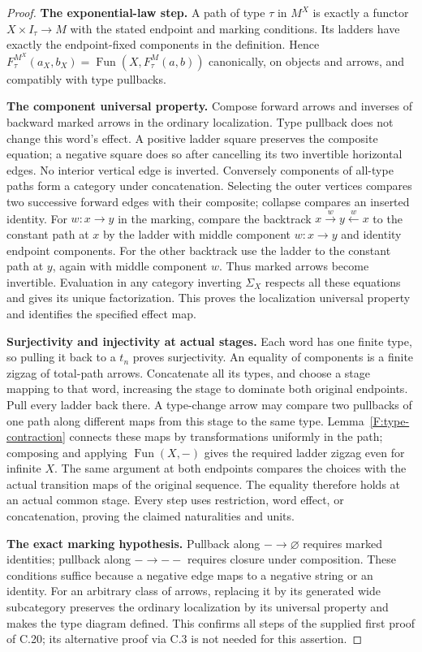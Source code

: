 \begin{proof}
\textbf{The exponential-law step.} A path of type $\tau$ in $M^X$ is
exactly a functor $X\times I_\tau\to M$ with the stated endpoint and
marking conditions. Its ladders have exactly the endpoint-fixed
components in the definition. Hence
$F_\tau^{M^X}(a_X,b_X)=\operatorname{Fun}(X,F_\tau^M(a,b))$
canonically, on objects and arrows, and compatibly with type pullbacks.

\textbf{The component universal property.} Compose forward arrows and
inverses of backward marked arrows in the ordinary localization.
Type pullback does not change this word's effect. A positive ladder
square preserves the composite equation; a negative square does so
after cancelling its two invertible horizontal edges. No interior
vertical edge is inverted. Conversely components of all-type paths
form a category under concatenation. Selecting the outer vertices
compares two successive forward edges with their composite; collapse
compares an inserted identity. For $w:x\to y$ in the marking, compare
the backtrack $x\xrightarrow{w}y\xleftarrow{w}x$ to the constant
path at $x$ by the ladder with middle component $w:x\to y$ and
identity endpoint components. For the other backtrack use the ladder
to the constant path at $y$, again with middle component $w$.
Thus marked arrows become invertible. Evaluation in any category
inverting $\Sigma_X$ respects all these equations and gives its unique
factorization. This proves the localization universal property and
identifies the specified effect map.

\textbf{Surjectivity and injectivity at actual stages.} Each word has
one finite type, so pulling it back to a $t_n$ proves surjectivity.
An equality of components is a finite zigzag of total-path arrows.
Concatenate all its types, and choose a stage mapping to that word,
increasing the stage to dominate both original endpoints. Pull every
ladder back there. A type-change arrow may compare two pullbacks of
one path along different maps from this stage to the same type.
Lemma~\ref{F:type-contraction} connects these maps by transformations
uniformly in the path; composing and applying $\operatorname{Fun}(X,-)$
gives the required ladder zigzag even for infinite $X$. The same
argument at both endpoints compares the choices with the actual
transition maps of the original sequence. The equality therefore holds
at an actual common stage. Every step uses restriction, word effect,
or concatenation, proving the claimed naturalities and units.

\textbf{The exact marking hypothesis.} Pullback along
$-\to\varnothing$ requires marked identities; pullback along
$-\to--$ requires closure under composition. These conditions suffice
because a negative edge maps to a negative string or an identity.
For an arbitrary class of arrows, replacing it by its generated wide
subcategory preserves the ordinary localization by its universal
property and makes the type diagram defined. This confirms all steps
of the supplied first proof of C.20; its alternative proof via C.3
is not needed for this assertion.
\end{proof}
